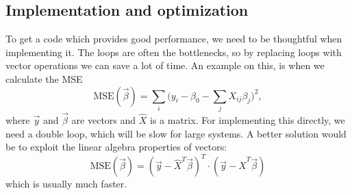 \subsection{Implementation and optimization} \label{sec:implementation}
To get a code which provides good performance, we need to be thoughtful when implementing it. The loops are often the bottlenecks, so by replacing loops with vector operations we can save a lot of time. An example on this, is when we calculate the MSE
\begin{equation}
\text{MSE}(\vec{\beta})=\sum_i\bigg(y_i-\beta_0-\sum_jX_{ij}\beta_j\bigg)^2,
\end{equation}
where $\vec{y}$ and $\vec{\beta}$ are vectors and $\hat{X}$ is a matrix. For implementing this directly, we need a double loop, which will be slow for large systems. A better solution would be to exploit the linear algebra properties of vectors:
\begin{equation}
\text{MSE}(\vec{\beta})=(\vec{y}-\hat{X}^T\vec{\beta})^T\cdot(\vec{y}-\hat{X}^T\vec{\beta})
\end{equation}
which is usually much faster. 